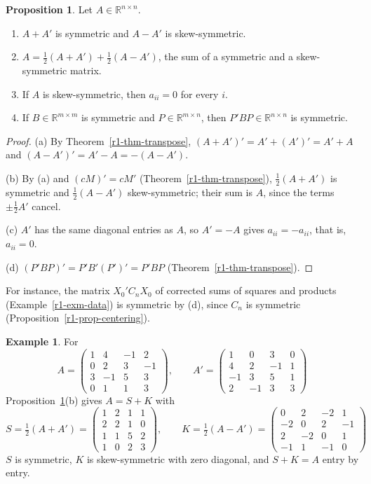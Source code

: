 \documentclass[12pt]{article}
\newcommand{\R}{\mathbb R}
\theoremstyle{definition}
\newtheorem{proposition}[theorem]{Proposition}
\newtheorem{example}[theorem]{Example}
\begin{document}
\begin{proposition}\label{r1-prop-sym-skew}
Let \(A\in\R^{n\times n}\).
\begin{enumerate}
\item \(A+A'\) is symmetric and \(A-A'\) is skew-symmetric.
\item \(A=\frac12(A+A')+\frac12(A-A')\), the sum of a symmetric and a skew-symmetric matrix.
\item If \(A\) is skew-symmetric, then \(a_{ii}=0\) for every \(i\).
\item If \(B\in\R^{m\times m}\) is symmetric and \(P\in\R^{m\times n}\), then \(P'BP\in\R^{n\times n}\) is symmetric.
\end{enumerate}
\end{proposition}
\begin{proof}
(a) By Theorem~\ref{r1-thm-transpose}, \((A+A')'=A'+(A')'=A'+A\) and \((A-A')'=A'-A=-(A-A')\).

(b) By (a) and \((cM)'=cM'\) (Theorem~\ref{r1-thm-transpose}), \(\frac12(A+A')\) is symmetric and \(\frac12(A-A')\)
skew-symmetric; their sum is \(A\), since the terms \(\pm\frac12A'\) cancel.

(c) \(A'\) has the same diagonal entries as \(A\), so \(A'=-A\) gives \(a_{ii}=-a_{ii}\), that is, \(a_{ii}=0\).

(d) \((P'BP)'=P'B'(P')'=P'BP\) (Theorem~\ref{r1-thm-transpose}).
\end{proof}
For instance, the matrix \(X_0'C_nX_0\) of corrected sums of squares and products (Example~\ref{r1-exm-data}) is
symmetric by (d), since \(C_n\) is symmetric (Proposition~\ref{r1-prop-centering}).

\begin{example}\label{r1-exm-sym-skew}
For
\[
A=\begin{pmatrix}1&4&-1&2\\0&2&3&-1\\3&-1&5&3\\0&1&1&3\end{pmatrix},\qquad
A'=\begin{pmatrix}1&0&3&0\\4&2&-1&1\\-1&3&5&1\\2&-1&3&3\end{pmatrix}
\]
Proposition~\ref{r1-prop-sym-skew}(b) gives \(A=S+K\) with
\[
S=\tfrac12(A+A')=\begin{pmatrix}1&2&1&1\\2&2&1&0\\1&1&5&2\\1&0&2&3\end{pmatrix},\qquad
K=\tfrac12(A-A')=\begin{pmatrix}0&2&-2&1\\-2&0&2&-1\\2&-2&0&1\\-1&1&-1&0\end{pmatrix}
\]
\(S\) is symmetric, \(K\) is skew-symmetric with zero diagonal, and \(S+K=A\) entry by entry.
\end{example}
\end{document}
